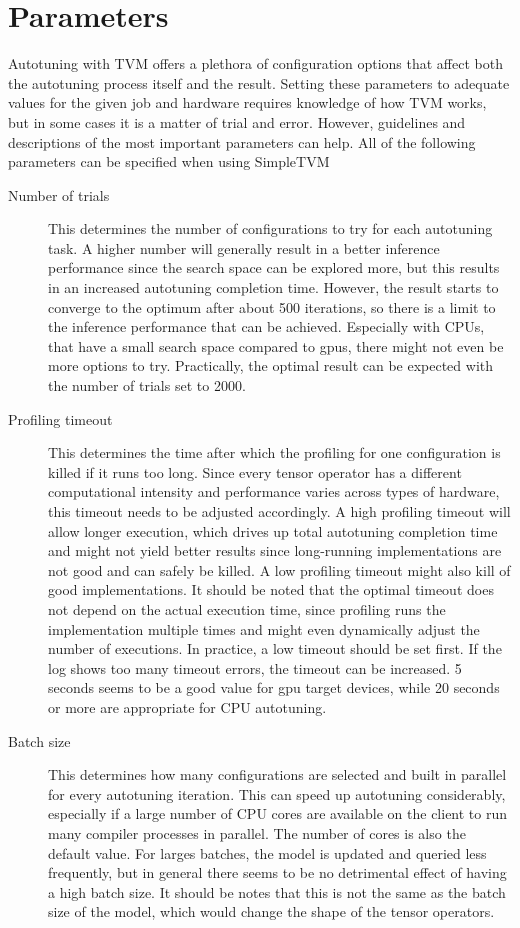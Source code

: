 \section{Parameters}
Autotuning with TVM offers a plethora of configuration options that affect both the autotuning process itself and the result. Setting these parameters to adequate values for the given job and hardware requires knowledge of how TVM works, but in some cases it is a matter of trial and error. However, guidelines and descriptions of the most important parameters can help. All of the following parameters can be specified when using SimpleTVM
\begin{description}
	\item[Number of trials] This determines the number of configurations to try for each autotuning task. A higher number will generally result in a better inference performance since the search space can be explored more, but this results in an increased autotuning completion time. However, the result starts to converge to the optimum after about 500 iterations, so there is a limit to the inference performance that can be achieved. Especially with CPUs, that have a small search space compared to \glspl{gpu}, there might not even be more options to try. Practically, the optimal result can be expected with the number of trials set to 2000.
	\item[Profiling timeout] This determines the time after which the profiling for one configuration is killed if it runs too long. Since every tensor operator has a different computational intensity and performance varies across types of hardware, this timeout needs to be adjusted accordingly. A high profiling timeout will allow longer execution, which drives up total autotuning completion time and might not yield better results since long-running implementations are not good and can safely be killed. A low profiling timeout might also kill of good implementations. It should be noted that the optimal timeout does not depend on the actual execution time, since profiling runs the implementation multiple times and might even dynamically adjust the number of executions. In practice, a low timeout should be set first. If the log shows too many timeout errors, the timeout can be increased. 5 seconds seems to be a good value for \gls{gpu} target devices, while 20 seconds or more are appropriate for CPU autotuning.
	\item[Batch size] This determines how many configurations are selected and built in parallel for every autotuning iteration. This can speed up autotuning considerably, especially if a large number of CPU cores are available on the client to run many compiler processes in parallel. The number of cores is also the default value. For larges batches, the model is updated and queried less frequently, but in general there seems to be no detrimental effect of having a high batch size. It should be notes that this is not the same as the batch size of the model, which would change the shape of the tensor operators.

\end{description}
